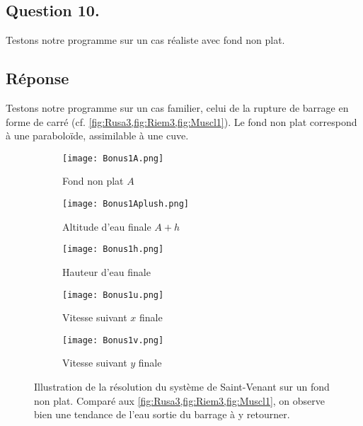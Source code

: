 \documentclass[
	french,
	11pt, %
]{fphw}
\begin{document}
\subsection*{Question 10.}

\begin{problem}
	Testons notre programme sur un cas réaliste avec fond non plat. 
\end{problem}

\subsection*{Réponse} 

Testons notre programme sur un cas familier, celui de la rupture de barrage en forme de carré (cf. \cref{fig:Rusa3,fig:Riem3,fig:Muscl1}). Le fond non plat correspond à une paraboloïde, assimilable à une cuve.
\begin{figure}[H]
	\centering
	\begin{subfigure}{0.45\textwidth}
		\centering
		\texttt{[image: Bonus1A.png]}
		\caption{Fond non plat $A$}
	\end{subfigure}
	\begin{subfigure}{0.45\textwidth}
		\centering
		\texttt{[image: Bonus1Aplush.png]}
		\caption{Altitude d'eau finale $A+h$}
	\end{subfigure}
	\begin{subfigure}{0.32\textwidth}
		\centering
		\texttt{[image: Bonus1h.png]}
		\caption{Hauteur d'eau finale}
		\label{fig:Bonus1h}
	\end{subfigure}
	\begin{subfigure}{0.32\textwidth}
		\centering
		\texttt{[image: Bonus1u.png]}
		\caption{Vitesse suivant $x$ finale}
		\label{fig:Bonus1u}
	\end{subfigure}
	\begin{subfigure}{0.32\textwidth}
		\centering
		\texttt{[image: Bonus1v.png]}
		\caption{Vitesse suivant $y$ finale}
		\label{fig:Bonus1v}
	\end{subfigure}
	\caption{Illustration de la résolution du système de Saint-Venant sur un fond non plat. Comparé aux \cref{fig:Rusa3,fig:Riem3,fig:Muscl1}, on observe bien une tendance de l'eau sortie du barrage à y retourner.}
	\label{fig:Bonus1}
\end{figure}
\end{document}
